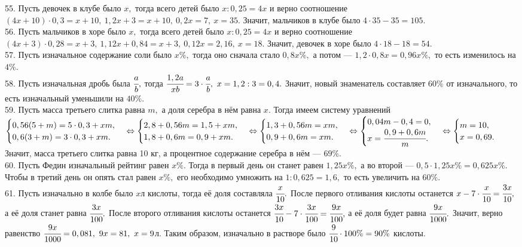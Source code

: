 55. Пусть девочек в клубе было $x,$ тогда всего детей было $x:0,25=4x$ и верно соотношение $(4x+10)\cdot0,3=x+10,\ 1,2x+3=x+10,\ 0,2x=7,\ x=35.$ Значит, мальчиков в клубе было $4\cdot35-35=105.$\\
56. Пусть мальчиков в хоре было $x,$ тогда всего детей было $x:0,25=4x$ и верно соотношение $(4x+3)\cdot0,28=x+3,\ 1,12x+0,84=x+3,\ 0,12x=2,16,\ x=18.$ Значит, девочек в хоре было $4\cdot18-18=54.$\\
57. Пусть изначальное содержание соли было $x\%,$ тогда оно сначала стало $0,8x\%,$ а потом --- $1,2\cdot0,8x=0,96x\%,$ то есть изменилось на $4\%.$\\
58. Пусть изначальная дробь была $\cfrac{a}{b},$ тогда $\cfrac{1,2a}{xb}=3\cdot \cfrac{a}{b},\ x=1,2:3=0,4.$ Значит, новый знаменатель составляет $60\%$ от изначального, то есть изначальный уменьшили на $40\%.$\\
59. Пусть масса третьего слитка равна $m,$ а доля серебра в нём равна $x.$ Тогда имеем систему уравнений $\begin{cases}0,56(5+m)=5\cdot0,3+xm,\\0,6(3+m)=3\cdot0,3+xm.\end{cases}\Leftrightarrow
\begin{cases}2,8+0,56m=1,5+xm,\\ 1,8+0,6m=0,9+xm.\end{cases}\Leftrightarrow
\begin{cases}1,3+0,56m=xm,\\ 0,9+0,6m=xm.\end{cases}\Leftrightarrow
\begin{cases}0,04m-0,4=0,\\ x=\cfrac{0,9+0,6m}{m}.\end{cases}\Leftrightarrow
\begin{cases}m=10,\\ x=0,69.\end{cases}$ Значит, масса третьего слитка равна 10 кг, а процентное содержание серебра в нём --- $69\%.$\\
60. Пусть Федин изначальный рейтинг равен $x\%.$ Тогда в первый день он станет равен $1,25x\%,$ а во второй --- $0,5\cdot1,25x\%=0,625x\%.$ Чтобы в третий день он опять стал равен $x\%,$ его необходимо умножить на $1:0,625=1,6,$ то есть увеличить на $60\%.$\\
61. Пусть изначально в колбе было $x$л кислоты, тогда её доля составляла $\cfrac{x}{10}.$ После первого отливания кислоты останется $x-7\cdot\cfrac{x}{10}=\cfrac{3x}{10},$ а её доля станет равна $\cfrac{3x}{100}.$ После второго отливания кислоты останется $\cfrac{3x}{10}-7\cdot\cfrac{3x}{100}=\cfrac{9x}{100},$ а её доля будет равна $\cfrac{9x}{1000}.$ Значит, верно равенство $\cfrac{9x}{1000}=0,081,\ 9x=81,\ x=9$л. Таким образом, изначально в растворе было $\cfrac{9}{10}\cdot100\%=90\%$ кислоты.\\
